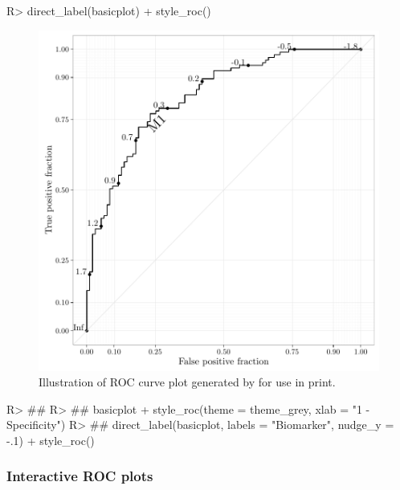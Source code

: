 \documentclass[codesnippet]{jss}
\begin{document}
\begin{Schunk}
\begin{Sinput}
R> direct_label(basicplot) + style_roc()
\end{Sinput}
\begin{figure}
\includegraphics{figure/print-1} \caption{Illustration of ROC curve plot generated by  for use in print. \label{first}}\label{fig:print}
\end{figure}
\begin{Sinput}
R> ## 
R> ## basicplot + style_roc(theme = theme_grey, xlab = "1 - Specificity")
R> ## direct_label(basicplot, labels = "Biomarker", nudge_y = -.1) + style_roc()
\end{Sinput}
\end{Schunk}

\subsubsection{Interactive ROC plots}\label{interactive-roc-plots}
\end{document}
